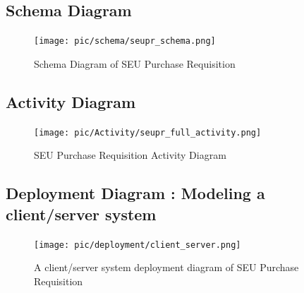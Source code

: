 \documentclass[12pt]{report} %
\begin{document}
\begin{landscape}
\subsection{Schema Diagram}
\begin{figure}[h]
	\begin{center}
		\texttt{[image: pic/schema/seupr\_schema.png]}
	\end{center}
	\caption{Schema Diagram of SEU Purchase Requisition}
	\label{fig:context_level}
\end{figure}
\thispagestyle{empty} 
\end{landscape}

\restoregeometry




\ifx
{}
\begin{landscape}
\subsection{Activity Diagram}
\begin{figure}[h]

	\begin{center}
	\texttt{[image: pic/Activity/seupr\_full\_activity.png]}
	\end{center}
	\caption{SEU Purchase Requisition Activity Diagram}
	\label{fig:activity}
\end{figure}
\thispagestyle{empty} 
\end{landscape}

\restoregeometry
\fi




\subsection{Deployment Diagram : Modeling a client/server system}

\begin{figure}[h]
	\texttt{[image: pic/deployment/client\_server.png]}
	\caption{A client/server system deployment diagram of SEU Purchase Requisition}
	\label{fig:client_server}
\end{figure}
\end{document}
